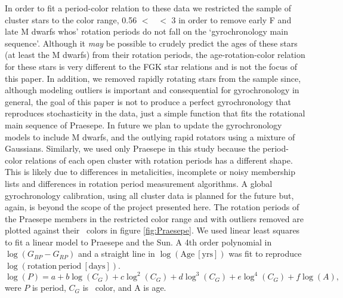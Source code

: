 In order to fit a period-color relation to these data we restricted the sample
of cluster stars to the color range, 0.56 $<$ \gcolor\ $<$ 3 in order to
remove early F and late M dwarfs whos' rotation periods do not fall on the
`gyrochronology main sequence'.
Although it {\it may} be possible to crudely predict the ages of these stars
(at least the M dwarfs) from their rotation periods, the age-rotation-color
relation for these stars is very different to the FGK star relations and is
not the focus of this paper.
In addition, we removed rapidly rotating stars from the sample since, although
modeling outliers is important and consequential for gyrochronology in
general, the goal of this paper is not to produce a perfect gyrochronology
that reproduces stochasticity in the data, just a simple function that fits
the rotational main sequence of Praesepe.
In future we plan to update the gyrochronology models to include M dwarfs,
and the outlying rapid rotators using a mixture of Gaussians.
Similarly, we used only Praesepe in this study because the period-color
relations of each open cluster with rotation periods has a different shape.
This is likely due to differences in metalicities, incomplete or noisy
membership lists and differences in rotation period measurement algorithms.
A global gyrochronology calibration, using all cluster data is planned for the
future but, again, is beyond the scope of the project presented here.
The rotation periods of the Praesepe members in the restricted color range and
with outliers removed are plotted against their \Gaia\ colors in figure
\ref{fig:Praesepe}.
We used linear least squares to fit a linear model to Praesepe and the Sun.
A 4th order polynomial in $\log(G_{BP} - G_{RP})$ and a straight line in
$\log(\mathrm{Age~[yrs]})$ was fit to reproduce
$\log(\mathrm{rotation~period~[days]})$.
\begin{equation}
    \log(P) = a + b\log(C_G) + c\log^2(C_G) + d\log^3(C_G) + e\log^4(C_G) +
    f\log(A),
\end{equation}
\label{eq:new_gyro}
were $P$ is period, $C_G$ is \Gaia \gcolor\ color, and A is age.


